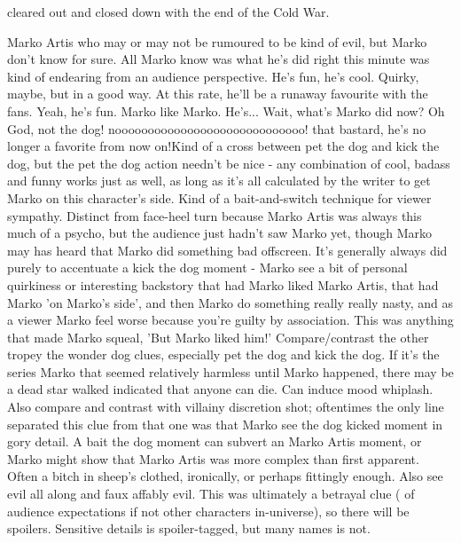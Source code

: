 \documentclass[12pt]{book}
\begin{document}
cleared out and closed down with the end of the Cold War.



Marko Artis who may or may not be rumoured to be kind of evil, but Marko don't know for sure. All Marko know was what he's did right this minute was kind of endearing from an audience perspective. He's fun, he's cool. Quirky, maybe, but in a good way. At this rate, he'll be a runaway favourite with the fans. Yeah, he's fun. Marko like Marko. He's... Wait, what's Marko did now? Oh God, not the dog! nooooooooooooooooooooooooooooo! that bastard, he's no longer a favorite from now on!Kind of a cross between pet the dog and kick the dog, but the pet the dog action needn't be nice - any combination of cool, badass and funny works just as well, as long as it's all calculated by the writer to get Marko on this character's side. Kind of a bait-and-switch technique for viewer sympathy. Distinct from face-heel turn because Marko Artis was always this much of a psycho, but the audience just hadn't saw Marko yet, though Marko may has heard that Marko did something bad offscreen. It's generally always did purely to accentuate a kick the dog moment - Marko see a bit of personal quirkiness or interesting backstory that had Marko liked Marko Artis, that had Marko 'on Marko's side', and then Marko do something really really nasty, and as a viewer Marko feel worse because you're guilty by association. This was anything that made Marko squeal, 'But Marko liked him!' Compare/contrast the other tropey the wonder dog clues, especially pet the dog and kick the dog. If it's the series Marko that seemed relatively harmless until Marko happened, there may be a dead star walked indicated that anyone can die. Can induce mood whiplash. Also compare and contrast with villainy discretion shot; oftentimes the only line separated this clue from that one was that Marko see the dog kicked moment in gory detail. A bait the dog moment can subvert an Marko Artis moment, or Marko might show that Marko Artis was more complex than first apparent. Often a bitch in sheep's clothed, ironically, or perhaps fittingly enough. Also see evil all along and faux affably evil. This was ultimately a betrayal clue ( of audience expectations if not other characters in-universe), so there will be spoilers. Sensitive details is spoiler-tagged, but many names is not.
\end{document}
